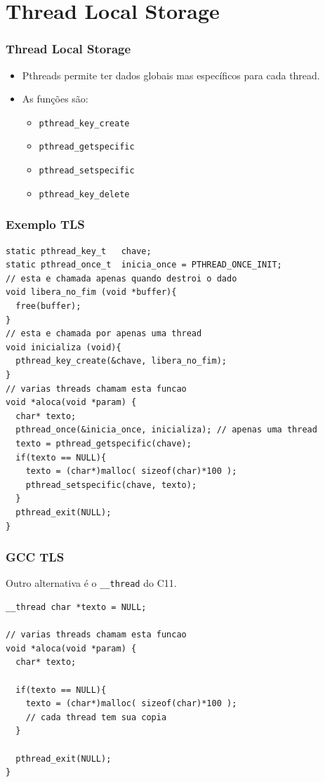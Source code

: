 \documentclass[xcolor=dvipsnames,11pt,presentation,aspectratio=169]{beamer}
\begin{document}
\section{Thread Local Storage}
\begin{frame}
  \frametitle{Thread Local Storage}
  \begin{itemize}
  \item Pthreads permite ter dados globais mas específicos para cada thread.
  \item As funções são:
    \begin{itemize}
      \item \texttt{pthread\_key\_create}
      \item \texttt{pthread\_getspecific}
      \item \texttt{pthread\_setspecific}
      \item \texttt{pthread\_key\_delete}
    \end{itemize}  
  \end{itemize}
\end{frame}
\begin{frame}[fragile]
  \frametitle{Exemplo TLS}
  \vspace{-5mm}
\begin{lstlisting}
static pthread_key_t   chave;
static pthread_once_t  inicia_once = PTHREAD_ONCE_INIT;
// esta e chamada apenas quando destroi o dado
void libera_no_fim (void *buffer){
  free(buffer);
}
// esta e chamada por apenas uma thread
void inicializa (void){
  pthread_key_create(&chave, libera_no_fim);
}
// varias threads chamam esta funcao
void *aloca(void *param) { 
  char* texto;
  pthread_once(&inicia_once, inicializa); // apenas uma thread 
  texto = pthread_getspecific(chave);
  if(texto == NULL){
    texto = (char*)malloc( sizeof(char)*100 );
    pthread_setspecific(chave, texto);
  }
  pthread_exit(NULL);
}
\end{lstlisting}
\end{frame}
\begin{frame}[fragile]
  \frametitle{GCC TLS}
  \vspace{-5mm}
  Outro alternativa é o \texttt{\_\_thread} do C11.
\begin{lstlisting}
__thread char *texto = NULL;

// varias threads chamam esta funcao
void *aloca(void *param) { 
  char* texto;

  if(texto == NULL){
    texto = (char*)malloc( sizeof(char)*100 );
    // cada thread tem sua copia
  }

  pthread_exit(NULL);
}
\end{lstlisting}
\end{frame}
\end{document}
